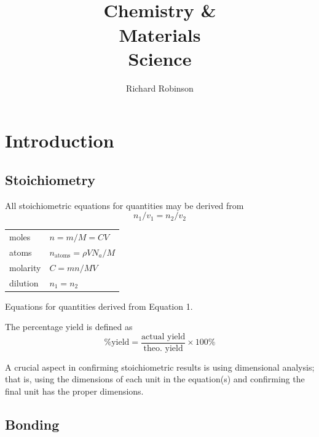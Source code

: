 \documentclass{tufte-book}
\title{\\ Chemistry \& \\ Materials \\ Science}
\author{Richard Robinson}
\begin{document}
\frontmatter
\maketitle

\setlength{\parindent}{0pt}

\mainmatter



\chapter{Introduction}

\section{Stoichiometry}

All stoichiometric equations for quantities may be derived from \begin{equation}
  n_1/v_1 = n_2/v_2
\end{equation}

\begin{marginfigure}
  \begin{center}
    \begin{tabular}{ll}
      moles & $n = m/M = CV$ \\
      atoms & $n_{\mathrm{atoms}} = \rho V N_a / M$ \\
      molarity & $C = mn/MV$ \\
      dilution & $n_1 = n_2$
    \end{tabular} \phantom{mm}
  \end{center}
  \caption[]{Equations for quantities derived from Equation 1.}
\end{marginfigure}

The percentage yield is defined as \begin{equation}
  \text{\% yield} = \frac{\text{actual yield}}{\text{theo. yield}} \times 100 \%
\end{equation}

A crucial aspect in confirming stoichiometric results is using dimensional analysis; that is, using the dimensions of each unit in the equation(s) and confirming the final unit has the proper dimensions.

\section{Bonding}
\end{document}

